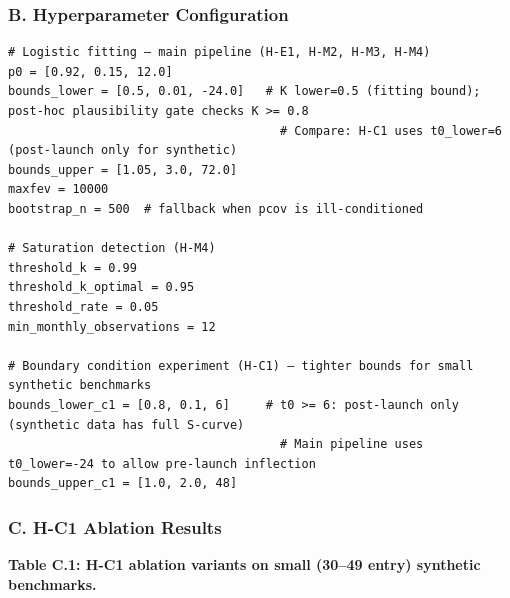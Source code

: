 \subsubsection{B. Hyperparameter Configuration}

\begin{verbatim}
# Logistic fitting — main pipeline (H-E1, H-M2, H-M3, H-M4)
p0 = [0.92, 0.15, 12.0]
bounds_lower = [0.5, 0.01, -24.0]   # K lower=0.5 (fitting bound); post-hoc plausibility gate checks K >= 0.8
                                      # Compare: H-C1 uses t0_lower=6 (post-launch only for synthetic)
bounds_upper = [1.05, 3.0, 72.0]
maxfev = 10000
bootstrap_n = 500  # fallback when pcov is ill-conditioned

# Saturation detection (H-M4)
threshold_k = 0.99
threshold_k_optimal = 0.95
threshold_rate = 0.05
min_monthly_observations = 12

# Boundary condition experiment (H-C1) — tighter bounds for small synthetic benchmarks
bounds_lower_c1 = [0.8, 0.1, 6]     # t0 >= 6: post-launch only (synthetic data has full S-curve)
                                      # Main pipeline uses t0_lower=-24 to allow pre-launch inflection
bounds_upper_c1 = [1.0, 2.0, 48]
\end{verbatim}

\subsubsection{C. H-C1 Ablation Results}

\textbf{Table C.1: H-C1 ablation variants on small (30--49 entry) synthetic benchmarks.}

\begin{table}[htbp]
\centering
{}
\end{table}

